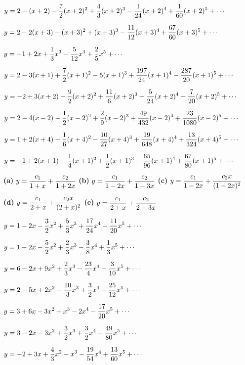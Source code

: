 $y=\displaystyle{2-(x+2)-\frac{7}{2}(x+2)^{2}+\frac{4}{3}(x+2)^{3}-\frac{1}{24}(x+2)^{4}
+\frac{1}{60}(x+2)^{5}+\cdots}$

$y=\displaystyle{2-2(x+3)-(x+3)^{2}+(x+3)^{3}-\frac{11}{12}(x+3)^{4}+
\frac{67}{60}(x+3)^{5}+\cdots}$

$y=\displaystyle{-1+2x+\frac{1}{3}x^{3}-\frac{5}{12}x^{4}+\frac{2}{5}x^{5}+\cdots}$

$y=\displaystyle{2-3(x+1)+\frac{7}{2}(x+1)^{2}-5(x+1)^{3}+\frac{197}{24}(x+1)^{4}
-\frac{287}{20}(x+1)^{5}+\cdots}$

$y=\displaystyle{-2+3(x+2)-\frac{9}{2}(x+2)^{2}+\frac{11}{6}(x+2)^{3}+\frac{5}{24}(x+2)^{4}
+\frac{7}{20}(x+2)^{5}+\cdots}$

$y=\displaystyle{2-4(x-2)-\frac{1}{2}(x-2)^{2}+\frac{2}{9}(x-2)^{3}+\frac{49}{432}(x-2)^{4}
+\frac{23}{1080}(x-2)^{5}+\cdots}$

$y=\displaystyle{1+2(x+4)-\frac{1}{6}(x+4)^{2}-\frac{10}{27}(x+4)^{3}+\frac{19}{648}(x+4)^{4}
+\frac{13}{324}(x+4)^{5}+\cdots}$

$y=\displaystyle{-1+2(x+1)-\frac{1}{4}(x+1)^{2}+\frac{1}{2}(x+1)^{3}-\frac{65}{96}(x+1)^{4}
+\frac{67}{80}(x+1)^{5}+\cdots}$

{\bf (a)} $y=\displaystyle{\frac{c_{1}}{1+x}+\frac{c_{2}}{1+2x}}$
{\bf (b)} $y=\displaystyle{\frac{c_{1}}{1-2x}+\frac{c_{2}}{1-3x}}$
{\bf (c)} $y=\displaystyle{\frac{c_{1}}{1-2x}+\frac{c_{2}x}{(1-2x)^{2}}}$

\quad\;  \;
{\bf (d)} $y=\displaystyle{\frac{c_{1}}{2+x}+\frac{c_{2}x}{(2+x)^{2}}}$
{\bf (e)} $y=\displaystyle{\frac{c_{1}}{2+x}+\frac{c_{2}}{2+3x}}$

$y=\displaystyle{1-2x-\frac{3}{2}x^{2}+\frac{5}{3}x^{3}+\frac{17}{24}x^{4}-\frac{11}{20}x^{5}+\cdots}$

$y=\displaystyle{1-2x-\frac{5}{2}x^{2}+\frac{2}{3}x^{3}-\frac{3}{8}x^{4}+\frac{1}{3}x^{5}+\cdots}$

$y=\displaystyle{6-2x+9x^{2}+\frac{2}{3}x^{3}-\frac{23}{4}x^{4}-\frac{3}{10}x^{5}+\cdots}$

$y=\displaystyle{2-5x+2x^{2}-\frac{10}{3}x^{3}+\frac{3}{2}x^{4}-\frac{25}{12}x^{5}+\cdots}$

$y=\displaystyle{3+6x-3x^{2}+x^{3}-2x^{4}-\frac{17}{20}x^{5}+\cdots}$

$y=\displaystyle{3-2x-3x^{2}+\frac{3}{2}x^{3}+\frac{3}{2}x^{4}-\frac{49}{80}x^{5}+\cdots}$

$y=\displaystyle{-2+3x+\frac{4}{3}x^{2}-x^{3}-\frac{19}{54}x^{4}+\frac{13}{60}x^{5}+\cdots}$

